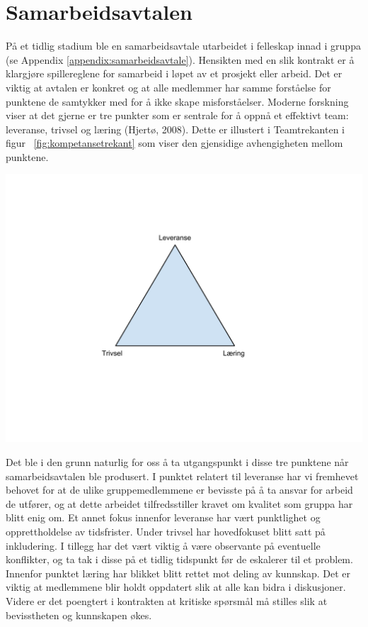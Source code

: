 \section{Samarbeidsavtalen}
På et tidlig stadium ble en samarbeidsavtale utarbeidet i felleskap innad i gruppa (se Appendix \ref{appendix:samarbeidsavtale}). Hensikten med en slik kontrakt er å klargjøre spillereglene for samarbeid i løpet av et prosjekt eller arbeid. Det er viktig at avtalen er konkret og at alle medlemmer har samme forståelse for punktene de samtykker med for å ikke skape misforståelser. Moderne forskning viser at det gjerne er tre punkter som er sentrale for å oppnå et effektivt team: leveranse, trivsel og læring (Hjertø, 2008). Dette er illustert i Teamtrekanten i figur  ~\ref{fig:kompetansetrekant} som viser den gjensidige avhengigheten mellom punktene.\\

\begin{center}
\includegraphics[clip=true, width=1 \textwidth,
trim=0cm 5cm 0cm 3cm]{kompetansetrekant.pdf}
\label{fig:kompetansetrekant}
\end{center}

Det ble i den grunn naturlig for oss å ta utgangspunkt i disse tre punktene når samarbeidsavtalen ble produsert. I punktet relatert til leveranse har vi fremhevet behovet for at de ulike gruppemedlemmene er bevisste på å ta ansvar for arbeid de utfører, og at dette arbeidet tilfredsstiller kravet om kvalitet som gruppa har blitt enig om. Et annet fokus innenfor leveranse har vært punktlighet og opprettholdelse av tidsfrister. Under trivsel har hovedfokuset blitt satt på inkludering. I tillegg har det vært viktig å være observante på eventuelle konflikter, og ta tak i disse på et tidlig tidspunkt før de eskalerer til et problem. Innenfor punktet læring har blikket blitt rettet mot deling av kunnskap. Det er viktig at medlemmene blir holdt oppdatert slik at alle kan bidra i diskusjoner. Videre er det poengtert i kontrakten at kritiske spørsmål må stilles slik at bevisstheten og kunnskapen økes.\\

